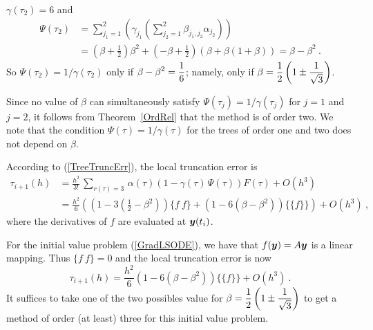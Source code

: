 {{\begin{enumerate}
$\gamma(\tau_2) = 6$ and
\begin{align*}
\Psi(\tau_2) &= \sum_{j_1=1}^2 \left( \gamma_{j_1}
 \left( \sum_{j_2=1}^2 \beta_{j_1,j_2} \alpha_{j_2}\right)\right) \\
&= \left(\beta + \frac{1}{2}\right)\beta^2
+ \left(-\beta + \frac{1}{2}\right)\left( \beta +\beta (1+\beta) \right)
= \beta - \beta^2 \ .
\end{align*}
So $\Psi(\tau_2) = 1/\gamma(\tau_2)$ only if
$\displaystyle \beta - \beta^2 = \frac{1}{6}$; namely, only if
$\displaystyle \beta = \frac{1}{2} \left(1 \pm \frac{1}{\sqrt{3}}\right)$.
\end{enumerate}
}

Since no value of $\beta$ can simultaneously satisfy
$\Psi(\tau_j) = 1/\gamma(\tau_j)$ for $j=1$ and $j=2$, it follows from
Theorem~\ref{OrdRel} that the method is of order two.   We note that
the condition $\Psi(\tau) = 1/\gamma(\tau)$ for the trees of order one
and two does not depend on $\beta$.

 According to (\ref{TreeTruncErr}), the local truncation error
is
\begin{align*}
\tau_{i+1}(h) &= \frac{h^2}{3!}\,\sum_{r(\tau)=3}\,\alpha(\tau) \left( 1
  -\gamma(\tau)\,\Psi(\tau) \right)F(\tau) + O(h^3) \\
& = \frac{h^2}{6} \left( \left( 1 - 3 \left(\frac{1}{2} - \beta^2\right)\right)
\{ f\ f\} + \left(1  - 6 (\beta - \beta^2)\right)\{\{f\}\}\right) +O(h^3) \ ,
\end{align*}
where the derivatives of $f$ are evaluated at $\bm{y}(t_i)$.

 For the initial value problem (\ref{GradLSODE}), we have that
$f(\bm{y}) = A\bm{y}$ is a linear mapping.  Thus $\{f \ f\} = 0$ and
the local truncation error is now
\[
  \tau_{i+1}(h) = \frac{h^2}{6}
  \left(1  - 6 (\beta - \beta^2)\right)\{\{f\}\} +O(h^3) \ .
\]
It suffices to take one of the two possibles value for
$\displaystyle \beta = \frac{1}{2} \left(1 \pm \frac{1}{\sqrt{3}}\right)$
to get a method of order (at least) three for this initial value problem.

}
